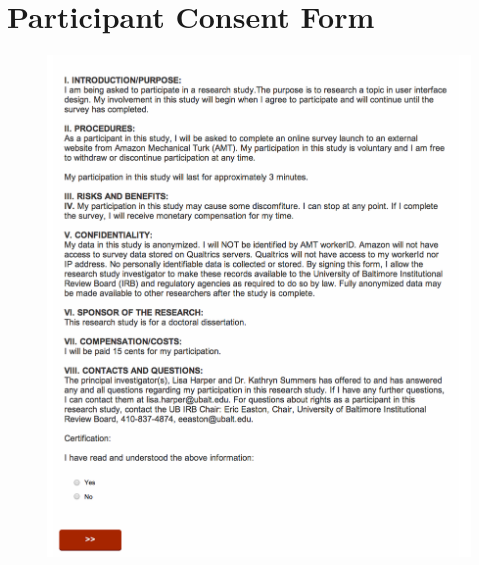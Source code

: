 \chapter{Participant Consent Form}
\label{consent}
\begin{figure}[h!]
\centerline{
\includegraphics[scale=.40]{chapter4.tex/consent}
}
\end{figure}